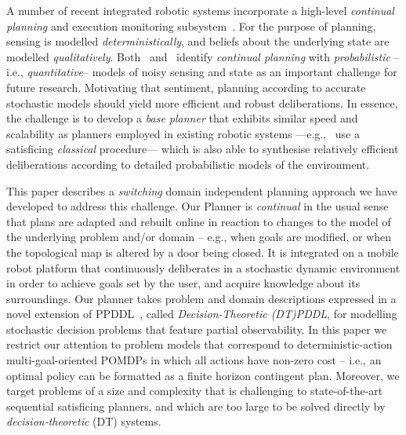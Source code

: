 



A number of recent integrated robotic systems incorporate a
high-level {\em continual planning} and execution monitoring
subsystem~\cite{wyattetal2010tamd,talamadupula:2010,Kraft2008}.
For the purpose of planning, sensing is modelled {\em
deterministically}, and beliefs about the underlying state are
modelled {\em qualitatively}.
Both~\citeauthor{talamadupula:2010} and~\citeauthor{wyattetal2010tamd}
identify
\emph{continual planning} with {\em probabilistic} --i.e., {\em quantitative}--
models of noisy sensing and state as an important challenge for future
research.
Motivating that sentiment, planning according to accurate
stochastic models should yield more efficient and robust
deliberations.
In essence, the challenge is to develop a {\em base planner} that
exhibits similar speed and scalability as planners employed in
existing robotic systems ---e.g.,~\citeauthor{wyattetal2010tamd} use a
satisficing {\em classical} procedure--- which is also able to
synthesise relatively efficient deliberations according to detailed
probabilistic models of the environment.


This paper describes a {\em switching} domain independent planning
approach we have developed to address this challenge. 
Our Planner is {\em continual} in the usual sense that plans are
adapted and rebuilt online in reaction to changes to the model of the
underlying problem and/or domain -- e.g., when goals are
modified, or when the topological map is altered by a door being
closed.
It is integrated on a mobile robot platform that continuously
deliberates in a stochastic dynamic environment in order to achieve
goals set by the user, and acquire knowledge about its surroundings.
Our planner takes problem and domain descriptions expressed in a novel
extension of PPDDL~\cite{younes:etal:2005}, called {\em
Decision-Theoretic (DT)PDDL}, for modelling stochastic decision
problems that feature partial observability.  In this paper we
restrict our attention to problem models that correspond to
deterministic-action multi-goal-oriented POMDPs 
in which all actions have
non-zero cost -- i.e., an optimal policy can be formatted as a finite
horizon contingent plan. Moreover, we target problems of a size and
complexity that is challenging to state-of-the-art sequential
satisficing planners, and which are too large to be solved directly by
{\em decision-theoretic} (DT) systems.

